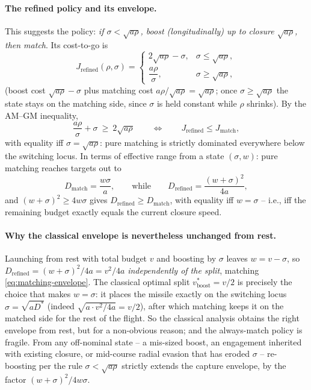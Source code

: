 \documentclass{article}
\theoremstyle{remark}
\begin{document}
\paragraph{The refined policy and its envelope.}
This suggests the policy: \emph{if $\sigma < \sqrt{a\rho}$, boost
  (longitudinally) up to closure $\sqrt{a\rho}$, then match}.  Its cost-to-go
is
\[
  J_\text{refined}(\rho, \sigma) =
  \begin{cases}
    2\sqrt{a\rho} - \sigma, & \sigma \le \sqrt{a\rho}, \\[2pt]
    \dfrac{a\rho}{\sigma}, & \sigma \ge \sqrt{a\rho},
  \end{cases}
\]
(boost cost $\sqrt{a\rho} - \sigma$ plus matching cost
$a\rho/\sqrt{a\rho} = \sqrt{a\rho}$; once $\sigma \ge \sqrt{a\rho}$ the state
stays on the matching side, since $\sigma$ is held constant while $\rho$
shrinks).  By the AM--GM inequality,
\[
  \frac{a\rho}{\sigma} + \sigma \ \ge\ 2\sqrt{a\rho}
  \qquad\Longleftrightarrow\qquad
  J_\text{refined} \le J_\text{match},
\]
with equality iff $\sigma = \sqrt{a\rho}$: pure matching is strictly dominated
everywhere below the switching locus.  In terms of effective range from a
state $(\sigma, w)$: pure matching reaches targets out to
\[
  D_\text{match} = \frac{w \sigma}{a},
  \qquad\text{while}\qquad
  D_\text{refined} = \frac{(w + \sigma)^2}{4a},
\]
and $(w+\sigma)^2 \ge 4 w \sigma$ gives $D_\text{refined} \ge D_\text{match}$,
with equality iff $w = \sigma$ -- i.e., iff the remaining budget exactly
equals the current closure speed.

\paragraph{Why the classical envelope is nevertheless unchanged from rest.}
Launching from rest with total budget $v$ and boosting by $\sigma$ leaves
$w = v - \sigma$, so $D_\text{refined} = (w + \sigma)^2/4a = v^2/4a$
\emph{independently of the split}, matching \cref{eq:matching-envelope}.  The
classical optimal split $v_\text{boost}^* = v/2$ is precisely the choice that
makes $w = \sigma$: it places the missile exactly on the switching locus
$\sigma = \sqrt{a D^*}$ (indeed $\sqrt{a \cdot v^2/4a} = v/2$), after which
matching keeps it on the matched side for the rest of the flight.  So the
classical analysis obtains the right envelope from rest, but for a
non-obvious reason; and the always-match policy is fragile.  From any
off-nominal state -- a mis-sized boost, an engagement inherited with existing
closure, or mid-course radial evasion that has eroded $\sigma$ -- re-boosting
per the rule $\sigma < \sqrt{a\rho}$ strictly extends the capture envelope,
by the factor $(w+\sigma)^2 / 4w\sigma$.
\end{document}
